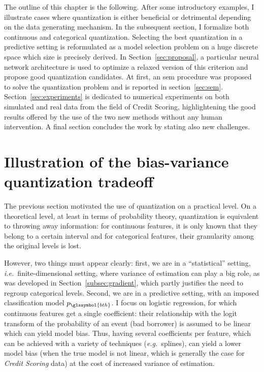 The outline of this chapter is the following. After some introductory examples, I illustrate cases where quantization is either beneficial or detrimental depending on the data generating mechanism. In the subsequent section, I formalize both continuous and categorical quantization. Selecting the best quantization in a predictive setting is reformulated as a model selection problem on a huge discrete space which size is precisely derived. In Section~\ref{sec:proposal}, a particular neural network architecture is used to optimize a relaxed version of this criterion and propose good quantization candidates. At first, an \gls{sem} procedure was proposed to solve the quantization problem and is reported in section~\ref{sec:sem}. Section~\ref{sec:experiments} is dedicated to numerical experiments on both simulated and real data from the field of Credit Scoring, highlightening the good results offered by the use of the two new methods without any human intervention. A final section concludes the work by stating also new challenges.


\section{Illustration of the bias-variance quantization tradeoff} \label{sec:bias_variance_quant}
 

The previous section motivated the use of quantization on a practical level. On a theoretical level, at least in terms of probability theory, quantization is equivalent to throwing away information: for continuous features, it is only known that they belong to a certain interval and for categorical features, their granularity among the original levels is lost.

However, two things must appear clearly: first, we are in a ``statistical'' setting, \textit{i.e.}\ finite-dimensional setting, where variance of estimation can play a big role, as was developed in Section~\ref{subsec:gradient}, which partly justifies the need to regroup categorical levels. Second, we are in a predictive setting, with an imposed classification model $p_{\glssymbol{bth}}$. I focus on logistic regression, for which continuous features get a single coefficient: their relationship with the logit transform of the probability of an event (bad borrower) is assumed to be linear which can yield model bias. Thus, having several coefficients per feature, which can be achieved with a  variety of techniques (\textit{e.g.}\ splines), can yield a lower model bias (when the true model is not linear, which is generally the case for \textit{Credit Scoring} data) at the cost of increased variance of estimation.

